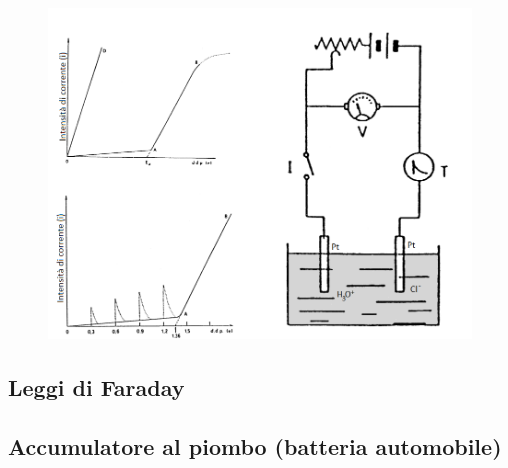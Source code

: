 \begin{figure}
    \centering
    \includegraphics[width=14cm]{immagini/elettrolisi.png}
\end{figure}
\subsection{Leggi di Faraday}
\subsection{Accumulatore al piombo (batteria automobile)}